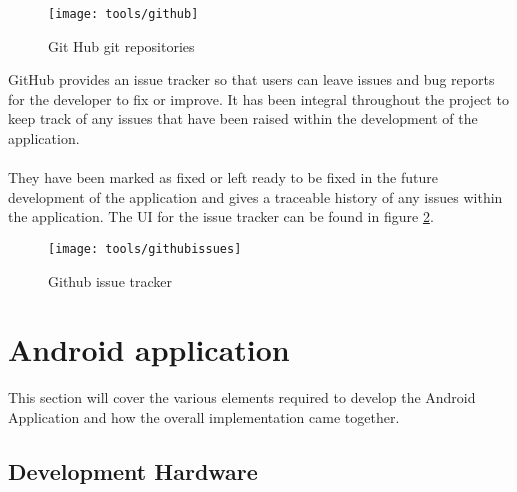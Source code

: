 \begin{figure}[H]
    \centering
    \texttt{[image: tools/github]}
    \caption{Git Hub git repositories}
    \label{fig:git_hub_repos_image}
\end{figure} 

\noindent
GitHub provides an issue tracker so that users can leave issues and bug reports for the developer to fix or improve. It has been integral throughout the project to keep track of any issues that have been raised within the development of the application.\\
\\
They have been marked as fixed or left ready to be fixed in the future development of the application and gives a traceable history of any issues within the application. The UI for the issue tracker can be found in figure \ref{fig:gh_issue_tracker_image}.

\begin{figure}[H]
    \centering
    \texttt{[image: tools/githubissues]}
    \caption{Github issue tracker}
    \label{fig:gh_issue_tracker_image}
\end{figure} 

\section{Android application}

This section will cover the various elements required to develop the Android Application and how the overall implementation came together.



\subsection{Development Hardware}
\label{sec:dev_hardware}

